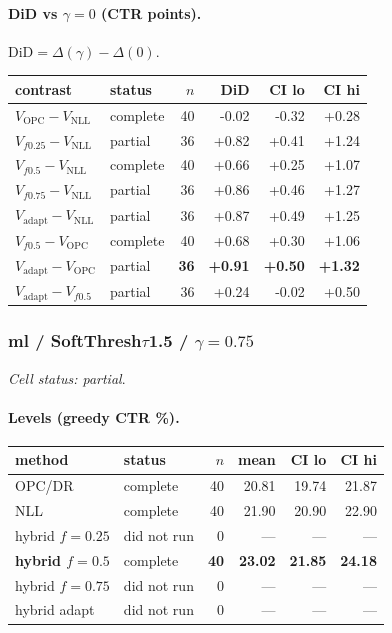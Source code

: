\documentclass[10pt,a4paper]{article}
\begin{document}
\paragraph{DiD vs $\gamma=0$ (CTR points).} $\mathrm{DiD}=\Delta(\gamma)-\Delta(0)$.
{\centering\small\begin{tabular}{llrrrr}
\toprule contrast & status & $n$ & DiD & CI lo & CI hi \\
\midrule
$V_{\mathrm{OPC}}-V_{\mathrm{NLL}}$ & complete & 40 & -0.02 & -0.32 & +0.28 \\
$V_{f0.25}-V_{\mathrm{NLL}}$ & partial & 36 & +0.82 & +0.41 & +1.24 \\
$V_{f0.5}-V_{\mathrm{NLL}}$ & complete & 40 & +0.66 & +0.25 & +1.07 \\
$V_{f0.75}-V_{\mathrm{NLL}}$ & partial & 36 & +0.86 & +0.46 & +1.27 \\
$V_{\mathrm{adapt}}-V_{\mathrm{NLL}}$ & partial & 36 & +0.87 & +0.49 & +1.25 \\
$V_{f0.5}-V_{\mathrm{OPC}}$ & complete & 40 & +0.68 & +0.30 & +1.06 \\
\textbf{$V_{\mathrm{adapt}}-V_{\mathrm{OPC}}$} & partial & \textbf{36} & \textbf{+0.91} & \textbf{+0.50} & \textbf{+1.32} \\
$V_{\mathrm{adapt}}-V_{f0.5}$ & partial & 36 & +0.24 & -0.02 & +0.50 \\
\bottomrule\end{tabular}\par}
\bigskip
\subsubsection{ml / SoftThresh$\tau$1.5 / $\gamma=0.75$}
\emph{Cell status: partial}.
\paragraph{Levels (greedy CTR \%).}
{\centering\small\begin{tabular}{llrrrr}
\toprule method & status & $n$ & mean & CI lo & CI hi \\
\midrule
OPC/DR & complete & 40 & 20.81 & 19.74 & 21.87 \\
NLL & complete & 40 & 21.90 & 20.90 & 22.90 \\
hybrid $f{=}0.25$ & did not run & 0 & --- & --- & --- \\
\textbf{hybrid $f{=}0.5$} & complete & \textbf{40} & \textbf{23.02} & \textbf{21.85} & \textbf{24.18} \\
hybrid $f{=}0.75$ & did not run & 0 & --- & --- & --- \\
hybrid adapt & did not run & 0 & --- & --- & --- \\
\bottomrule\end{tabular}\par}
\end{document}
